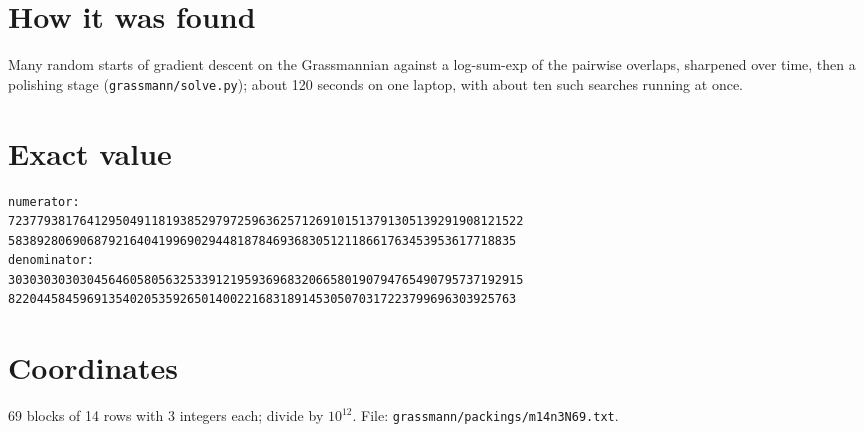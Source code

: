 \documentclass[11pt,a4paper]{article}
\begin{document}
\section{How it was found}
Many random starts of gradient descent on the Grassmannian against a log-sum-exp of the pairwise overlaps, sharpened over time, then a polishing stage (\texttt{grassmann/solve.py}); about 120 seconds on one laptop, with about ten such searches running at once.


\appendix
\section{Exact value}
{\small
\begin{verbatim}
numerator:
723779381764129504911819385297972596362571269101513791305139291908121522
58389280690687921640419969029448187846936830512118661763453953617718835
denominator:
303030303030456460580563253391219593696832066580190794765490795737192915
82204458459691354020535926501400221683189145305070317223799696303925763
\end{verbatim}}

\section{Coordinates}
69 blocks of 14 rows with 3 integers each; divide by $10^{12}$. File: \texttt{grassmann/packings/m14n3N69.txt}.
{\tiny
\begin{multicols}{3}
\end{multicols}}
\end{document}
